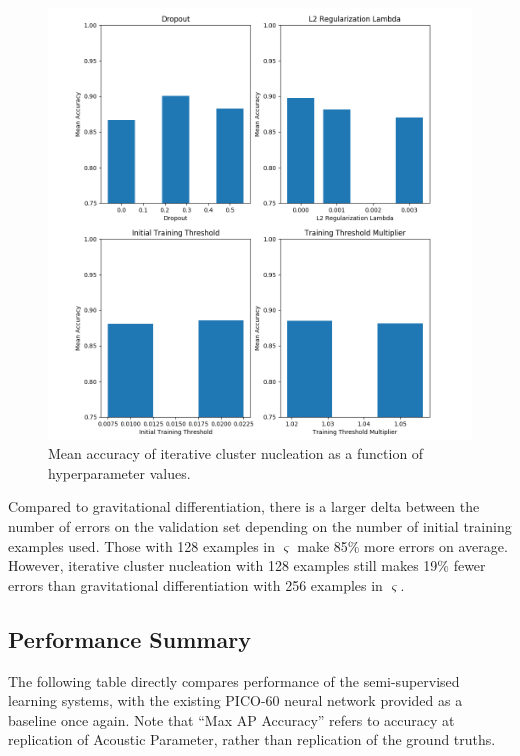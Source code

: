 \documentclass[10pt]{article}
\begin{document}
\begin{figure}[H]
    \centering
    \includegraphics[width=\textwidth]{icn_acc_by_hyper}
    \caption{\label{icn_acc_by_hyper} Mean accuracy of iterative cluster nucleation as a function of hyperparameter values.}
\end{figure}

Compared to gravitational differentiation, there is a larger delta between the number of errors on the validation set depending on the number of initial training examples used. Those with 128 examples in $\varsigma$ make 85\% more errors on average. However, iterative cluster nucleation with 128 examples still makes 19\% fewer errors than gravitational differentiation with 256 examples in $\varsigma$.

\subsection{Performance Summary}

The following table directly compares performance of the semi-supervised learning systems, with the existing PICO-60 neural network provided as a baseline once again. Note that ``Max AP Accuracy'' refers to accuracy at replication of Acoustic Parameter, rather than replication of the ground truths.
\end{document}
